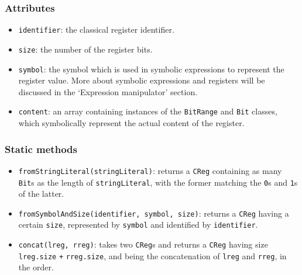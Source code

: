 \documentclass[12pt,a4paper]{report}
\theoremstyle{definition}
\theoremstyle{definition}
\theoremstyle{definition}
\begin{document}
\subsubsection{Attributes}
\begin{itemize}
    \itemsep 0em
    \item \texttt{identifier}: the classical register identifier.
    \item \texttt{size}: the number of the register bits.
    \item \texttt{symbol}: the symbol which is used in symbolic expressions to represent the register value. More about symbolic expressions and registers will be discussed in the `Expression manipulator' section.
    \item \texttt{content}: an array containing instances of the \texttt{BitRange} and \texttt{Bit} classes, which symbolically represent the actual content of the register.
\end{itemize}
\subsubsection{Static methods}
\begin{itemize}
    \item \texttt{fromStringLiteral(stringLiteral)}: returns a \texttt{CReg} containing as many \texttt{Bit}s as the length of \texttt{stringLiteral}, with the former matching the \texttt{0}s and \texttt{1}s of the latter.
    \item \texttt{fromSymbolAndSize(identifier, symbol, size)}: returns a \texttt{CReg} having a certain \texttt{size}, represented by \texttt{symbol} and identified by \texttt{identifier}.
    \item \texttt{concat(lreg, rreg)}: takes two \texttt{CReg}s and returns a \texttt{CReg} having size \texttt{lreg.size} \texttt{+} \texttt{rreg.size}, and being the concatenation of \texttt{lreg} and \texttt{rreg}, in the order.
\end{itemize}
\end{document}
